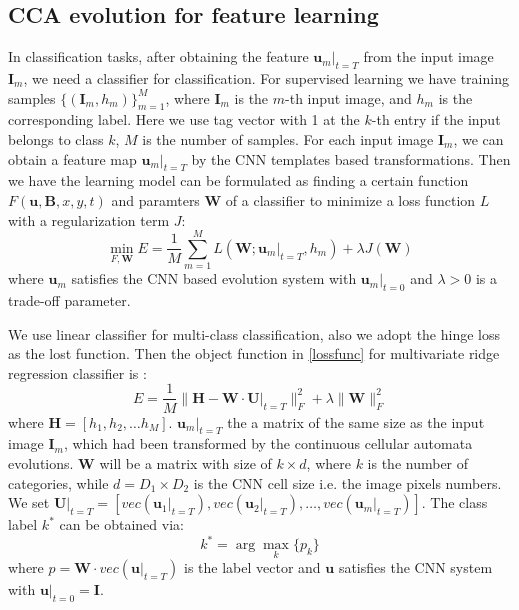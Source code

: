 \documentclass{amsart}
\theoremstyle{definition}
\theoremstyle{remark}
\numberwithin{equation}{section}
\begin{document}
\subsection{CCA evolution for feature learning}
In classification tasks, after obtaining the feature $\mathbf{u}_m|_{t=T}$ from the input image $\mathbf{I}_m$, we need a classifier for classification.
For supervised learning we have training samples $\{(\mathbf{I}_m, h_m)\}_{m=1}^M$, where $\mathbf{I}_m$ is the $m$-th input image, and $h_m$ is the corresponding label. Here we use tag vector with 1 at the $k$-th entry if the input belongs to class $k$, $M$ is the number of samples.
For each input image $\mathbf{I}_m$, we can obtain a feature map $\mathbf{u}_m|_{t=T}$ by the CNN templates based transformations.
Then we have the learning model can be formulated as finding a certain function $F(\mathbf{u},  \mathbf{B}, x, y, t)$ and paramters $\mathbf{W}$ of a classifier to minimize a loss function $L$ with a regularization term $J$:
\begin{equation}
\label{lossfunc}
\min_{F, \mathbf{W}} E = \frac{1}{M} \sum_{m=1}^M L(\mathbf{W}; \mathbf{u}_m|_{t=T}, h_m) + \lambda J(\mathbf{W})
\end{equation}
where $\mathbf{u}_m$ satisfies the CNN based evolution system with $\mathbf{u}_m|_{t=0}$ and $\lambda > 0$ is a trade-off parameter.

We use linear classifier for multi-class classification, also we adopt the hinge loss as the lost function.
Then the object function in \ref{lossfunc} for multivariate ridge regression classifier is :
\begin{equation}
E = \frac{1}{M}\lVert \mathbf{H} - \mathbf{W} \cdot \mathbf{U}|_{t=T} \rVert_F^2 + \lambda \lVert \mathbf{W} \rVert_F^2
\end{equation}
where $\mathbf{H} = [h_1, h_2, \dots h_M]$.
$\mathbf{u}_m|_{t=T}$ the a matrix of the same size as the input image $\mathbf{I}_m$, which had been transformed by the continuous cellular automata evolutions. $\mathbf{W}$ will be a matrix with size of $k \times d$, where  $k$ is the number of categories, while $d = D_1 \times D_2$ is the CNN cell size i.e. the image pixels numbers.
We set $\mathbf{U}|_{t=T} = [vec(\mathbf{u}_1|_{t=T}), vec(\mathbf{u}_2|_{t=T}), \dots, vec(\mathbf{u}_m|_{t=T})]$. The class label $k^*$ can be obtained via:
\begin{equation}
k^* = \arg \max_k\{p_k\}
\end{equation}
where $p = \mathbf{W} \cdot vec(\mathbf{u}|_{t=T})$ is the label vector and $\mathbf{u}$ satisfies the CNN system with $\mathbf{u}|_{t = 0} = \mathbf{I}$.
\end{document}

